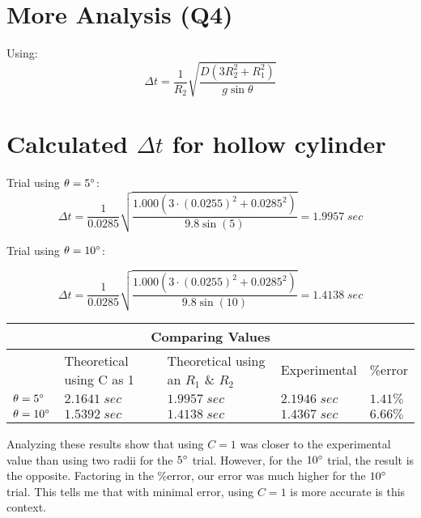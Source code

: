 \documentclass{report}
\begin{document}
\section{More Analysis (Q4)}

\noindent Using:
\begin{equation*}
  \Delta t = \frac{1}{R_2} \sqrt{ \frac {D(3R_2^2 + R_1^2)}{g \sin \theta} }
\end{equation*}

\section*{Calculated $\Delta t$ for hollow cylinder}

\noindent Trial using $\theta = 5\degree$:\\
\begin{equation*}
  \Delta t = \frac{1}{0.0285} \sqrt{ \frac {1.000(3 \cdot (0.0255)^2 + 0.0285^2)}{9.8 \sin (5)} } = 1.9957 \; sec
\end{equation*}

\noindent Trial using $\theta = 10\degree$:

\begin{equation*}
  \Delta t = \frac{1}{0.0285} \sqrt{ \frac {1.000(3 \cdot (0.0255)^2 + 0.0285^2)}{9.8 \sin (10)} } = 1.4138 \; sec
\end{equation*}

\begin{center}
  \begin{tabular} { |p{2cm}|p{2cm}|p{2cm}|p{2cm}|p{2cm}| }
    \hline
    \multicolumn{5}{|c|}{ Comparing Values } \\
    \hline 
    \centering & Theoretical using C as 1 & Theoretical using an $R_1$ \& $R_2$ &  Experimental & \%error \\ 
    \hline
    $\theta = 5\degree$ & $2.1641 \; sec$ & $1.9957 \; sec$ & $2.1946 \; sec$ & $1.41\%$ \\
    \hline
    $\theta = 10\degree$ & $1.5392 \; sec$ & $1.4138 \; sec$ & $1.4367 \; sec$ & $6.66\%$ \\
    \hline
  \end{tabular}
\end{center}

Analyzing these results show that using $C = 1$ was closer to the experimental value than
using two radii for the $5\degree$ trial. However, for the $10\degree$ trial, the result 
is the opposite. Factoring in the \%error, our error was much higher for the $10\degree$ trial.
This tells me that with minimal error, using $C = 1$ is more accurate is this context.
\end{document}
